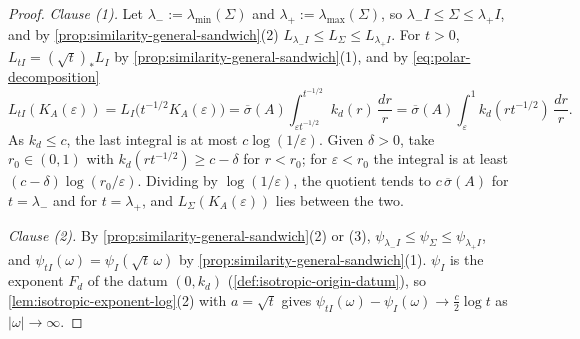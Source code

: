 \begin{proof}
\leanok
\emph{Clause (1).} Let $\lambda_- := \lambda_{\min}(\Sigma)$ and $\lambda_+ := \lambda_{\max}(\Sigma)$, so
$\lambda_-I \le \Sigma \le \lambda_+I$, and by \ref{prop:similarity-general-sandwich}(2)
$L_{\lambda_-I} \le L_\Sigma \le L_{\lambda_+I}$. For $t > 0$, $L_{tI} = (\sqrt t)_*L_I$ by
\ref{prop:similarity-general-sandwich}(1), and by \ref{eq:polar-decomposition}
\[
  L_{tI}(K_A(\varepsilon)) = L_I\bigl(t^{-1/2}K_A(\varepsilon)\bigr) = \overline\sigma(A)\int_{\varepsilon t^{-1/2}}^{t^{-1/2}}k_d(r)\,\frac{dr}{r}
  = \overline\sigma(A)\int_\varepsilon^1k_d(rt^{-1/2})\,\frac{dr}{r} .
\]
As $k_d \le c$, the last integral is at most $c\log(1/\varepsilon)$. Given $\delta > 0$, take $r_0 \in (0,1)$ with
$k_d(rt^{-1/2}) \ge c - \delta$ for $r < r_0$; for $\varepsilon < r_0$ the integral is at least $(c - \delta)\log(r_0/\varepsilon)$.
Dividing by $\log(1/\varepsilon)$, the quotient tends to $c\,\overline\sigma(A)$ for $t = \lambda_-$ and for $t = \lambda_+$, and
$L_\Sigma(K_A(\varepsilon))$ lies between the two.

\emph{Clause (2).} By \ref{prop:similarity-general-sandwich}(2) or (3), $\psi_{\lambda_-I} \le \psi_\Sigma \le
\psi_{\lambda_+I}$, and $\psi_{tI}(\omega) = \psi_I(\sqrt t\,\omega)$ by \ref{prop:similarity-general-sandwich}(1).
$\psi_I$ is the exponent $F_d$ of the datum $(0,k_d)$ (\ref{def:isotropic-origin-datum}), so
\ref{lem:isotropic-exponent-log}(2) with $a = \sqrt t$ gives $\psi_{tI}(\omega) - \psi_I(\omega) \to \tfrac c2\log t$ as
$|\omega| \to \infty$.


\end{proof}
